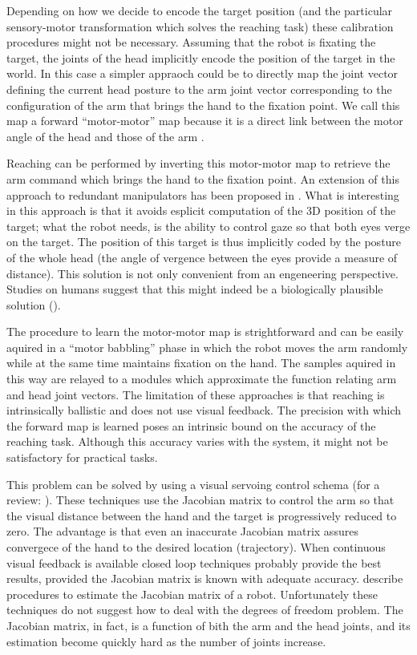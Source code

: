 Depending on how we decide to encode the target position (and the 
particular sensory-motor transformation which solves the reaching task)
these calibration procedures might not be necessary. Assuming that 
the robot is fixating the target, the joints of the head implicitly 
encode the position of the target in the world. In this case a simpler 
appraoch could be to directly map the joint vector defining the current 
head posture to the arm joint vector corresponding to the configuration 
of the arm that brings the hand to the fixation point. We call this map 
a forward ``motor-motor'' map because it is a direct link between the motor 
angle of the head and those of the arm 
\cite{blackburn94learning,metta99developmental}. 

Reaching can be performed by inverting this motor-motor 
map to retrieve the arm command which brings the hand to the fixation 
point. An extension of this approach to redundant manipulators has
been proposed in \cite{lopes06learning}. What is interesting in this 
approach is that it avoids esplicit computation of the 3D position 
of the target; what the robot needs, is the ability to control gaze
so that both eyes verge on the target. The position of 
this target is thus implicitly coded by the posture of the whole head (the 
angle of vergence between the eyes provide a measure of distance). 
This solution is not only convenient from an engeneering perspective. Studies 
on humans suggest that this might indeed be a biologically plausible 
solution (\cite{flanders-daghestani-berthoz-1999}).

The procedure to learn the motor-motor map is strightforward and can be 
easily aquired in a ``motor babbling'' phase in which the robot moves 
the arm randomly while at the same time maintains fixation on the hand. 
The samples aquired in this way are relayed to a modules which 
approximate the function relating arm and head joint vectors. The 
limitation of these approaches is that reaching
is intrinsically ballistic and does not use visual feedback. The precision 
with which the forward map is learned poses an intrinsic bound on
the accuracy of the reaching task. Although this accuracy varies with the
system, it might not be satisfactory for practical tasks.

This problem can be solved by using a visual servoing control schema (for a 
review: \cite{hutchinson96tutorial)}). These techniques use the 
Jacobian matrix to control the arm so that the visual distance between the 
hand and the target is progressively reduced to zero. The advantage is that 
even an inaccurate Jacobian matrix assures convergece 
of the hand to the desired location (trajectory). When continuous visual 
feedback is available closed loop techniques probably provide the best 
results, provided the Jacobian matrix is known with 
adequate accuracy. \cite{Hosoda94versatile,Mansard06jacobian,Lapreset04efficient} 
describe procedures to estimate the Jacobian matrix of a robot. Unfortunately 
these techniques do not suggest how to deal with the 
degrees of freedom problem. The Jacobian matrix, in fact, is a function
of bith the arm and the head joints, and its estimation become 
quickly hard as the number of joints increase.

